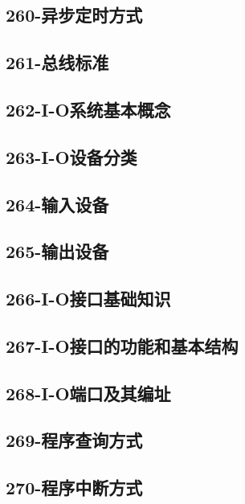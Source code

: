 \subsection{260-异步定时方式}

\subsection{261-总线标准}

\subsection{262-I-O系统基本概念}

\subsection{263-I-O设备分类}

\subsection{264-输入设备}

\subsection{265-输出设备}

\subsection{266-I-O接口基础知识}

\subsection{267-I-O接口的功能和基本结构}

\subsection{268-I-O端口及其编址}

\subsection{269-程序查询方式}

\subsection{270-程序中断方式}


